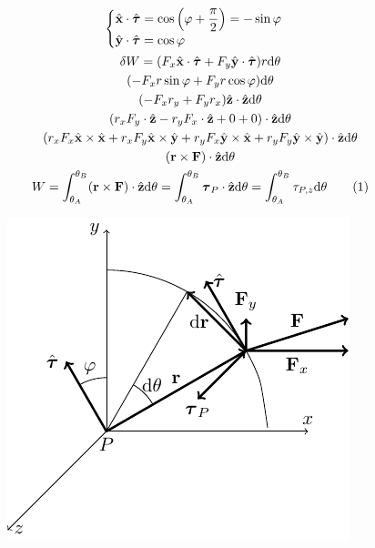 \documentclass{article}
\newcommand{\vect}[1]{\boldsymbol{\mathbf{#1}}}
\newcommand{\df}{\mathrm{d}}
\numberwithin{equation}{subsection}
\begin{document}
\begin{gather*}
    \begin{cases}
        \displaystyle\hat{\vect{x}}\cdot\hat{\vect{\tau}}=\cos\left(\varphi+\displaystyle\frac{\pi}{2}\right)=-\sin\varphi\\
        \displaystyle\hat{\vect{y}}\cdot\hat{\vect{\tau}}=\cos\varphi
    \end{cases}\\
    \delta W =(F_x\hat{\vect{x}}\cdot\hat{\vect{\tau}}+F_y\hat{\vect{y}}\cdot\hat{\vect{\tau}})r\df\theta\\
    (-F_xr\sin\varphi+F_yr\cos\varphi)\df\theta\\
    (-F_xr_y+F_yr_x)\hat{\vect{z}}\cdot\hat{\vect{z}}\df\theta\\
    (r_xF_y\cdot\hat{\vect{z}}-r_yF_x\cdot\hat{\vect{z}}+0+0)\cdot\hat{\vect{z}}\df\theta\\
    (r_xF_x\hat{\vect{x}}\times\hat{\vect{x}}+r_xF_y\hat{\vect{x}}\times\hat{\vect{y}}+r_yF_x\hat{\vect{y}}\times\hat{\vect{x}}+r_yF_y\hat{\vect{y}}\times\hat{\vect{y}})\cdot\hat{\vect{z}}\df\theta\\
    (\vect{r}\times\vect{F})\cdot\hat{\vect{z}}\df\theta\\
    W=\displaystyle\int_{\theta_A}^{\theta_B}(\vect{r}\times\vect{F})\cdot\hat{\vect{z}}\df\theta=\int_{\theta_A}^{\theta_B}\vect{\tau}_P\cdot\hat{\vect{z}}\df\theta=\int_{\theta_A}^{\theta_B}{\tau}_{P,z}\df\theta\tag{\stepcounter{equation}\theequation}
\end{gather*}

\begin{figure}[H]%
    \centering
    \includegraphics{feynman-momento.pdf}%
\end{figure}
\end{document}
